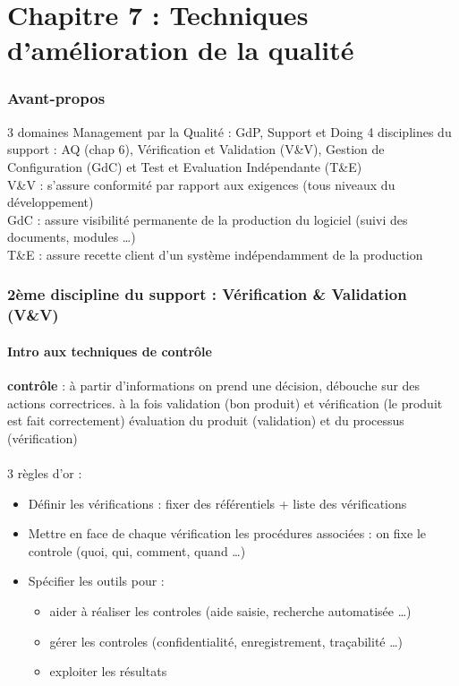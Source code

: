 \part{Chapitre 7 : Techniques d’amélioration de la qualité}

\section{Avant-propos}

3 domaines Management par la Qualité : GdP, Support et Doing
4 disciplines du support : AQ (chap 6), Vérification et Validation (V\&V), Gestion de Configuration (GdC) et Test et Evaluation Indépendante (T\&E)\\
V\&V : s’assure conformité par rapport aux exigences (tous niveaux du développement)\\
GdC : assure visibilité permanente de la production du logiciel (suivi des documents, modules …)\\
T\&E : assure recette client d’un système indépendamment de la production

\section{2ème discipline du support : Vérification \& Validation (V\&V)}

	\subsection{Intro aux techniques de contrôle}

\textbf{contrôle} : à partir d’informations on prend une décision, débouche sur des actions correctrices. à la fois validation (bon produit) et vérification (le produit est fait correctement)
évaluation du produit (validation) et du processus (vérification)\\\hfill\\

3 règles d’or :
\begin{itemize}
\item Définir les vérifications : fixer des référentiels + liste des vérifications
\item Mettre en face de chaque vérification les procédures associées : on fixe le controle (quoi, qui, comment, quand …)
\item Spécifier les outils pour : 
	\begin{itemize}
	\item aider à réaliser les controles (aide saisie, recherche automatisée …) 
	\item gérer les controles (confidentialité, enregistrement, traçabilité …)
	\item exploiter les résultats
	\end{itemize}
\end{itemize}


